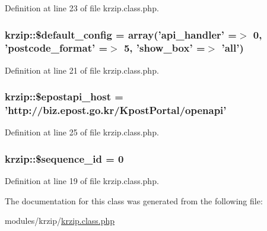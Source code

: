 Definition at line 23 of file krzip.\-class.\-php.

\hypertarget{classkrzip_a273480de1b1fabd56c60664a8a102eba}{
\subsubsection[{\$default\-\_\-config}]{\setlength{\rightskip}{0pt plus 5cm}krzip\-::\$default\-\_\-config = array('api\-\_\-handler' =$>$ 0, 'postcode\-\_\-format' =$>$ 5, 'show\-\_\-box' =$>$ 'all')\hspace{0.3cm}{\ttfamily [static]}}}\label{classkrzip_a273480de1b1fabd56c60664a8a102eba}


Definition at line 21 of file krzip.\-class.\-php.

\hypertarget{classkrzip_af44a847e3242f0cc5ad1ac3ddf679b93}{
\subsubsection[{\$epostapi\-\_\-host}]{\setlength{\rightskip}{0pt plus 5cm}krzip\-::\$epostapi\-\_\-host = 'http\-://biz.\-epost.\-go.\-kr/Kpost\-Portal/openapi'\hspace{0.3cm}{\ttfamily [static]}}}\label{classkrzip_af44a847e3242f0cc5ad1ac3ddf679b93}


Definition at line 25 of file krzip.\-class.\-php.

\hypertarget{classkrzip_a3fb8e2f6cc124b1f2a21a57e47e09c52}{
\subsubsection[{\$sequence\-\_\-id}]{\setlength{\rightskip}{0pt plus 5cm}krzip\-::\$sequence\-\_\-id = 0\hspace{0.3cm}{\ttfamily [static]}}}\label{classkrzip_a3fb8e2f6cc124b1f2a21a57e47e09c52}


Definition at line 19 of file krzip.\-class.\-php.



The documentation for this class was generated from the following file\-:\begin{DoxyCompactItemize}
\item 
modules/krzip/\hyperlink{krzip_8class_8php}{krzip.\-class.\-php}\end{DoxyCompactItemize}
